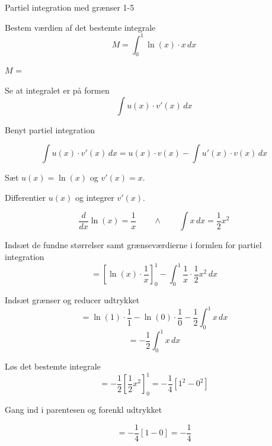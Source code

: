 \documentclass{article}
\begin{document}
\begin{exercise}{Partiel integration med grænser 1-5}


Bestem værdien af det bestemte integrale
\[
M = \int_0^1 \ln(x) \cdot x \, dx
\]

$M$ = 


\hint

Se at integralet er på formen
\[
\int u(x) \cdot v'(x) \, dx
\]

\hint

Benyt partiel integration

\hint
\[
\int u(x) \cdot v'(x)\, dx = u(x) \cdot v(x) - \int u'(x) \cdot v(x) \, dx
\]
\hint

Sæt $u(x) = \ln(x)$ og $v'(x) = x$.


\hint

Differentier $u(x)$ og integrer $v'(x)$.

\hint
\[
\frac{d}{dx} \ln(x) = \frac{1}{x} \qquad \wedge \qquad \int x \, dx = \frac{1}{2} x^2
\]

\hint

Indsæt de fundne størrelser samt grænseværdierne i formlen for partiel integration
\[
= \left[\ln(x) \cdot \frac{1}{x}\right]_{0}^{1} - \int_{0}^{1} \frac{1}{x} \cdot \frac{1}{2}x^2 \, dx
\]

\hint

Indsæt grænser og reducer udtrykket
\[
= \ln(1) \cdot \frac{1}{1} - \ln(0) \cdot \frac{1}{0} - \frac{1}{2} \int_{0}^{1} x \, dx
\]
\[
= - \frac{1}{2} \int_{0}^{1} x \, dx
\]

\hint
Løs det bestemte integrale
\[
= - \frac{1}{2} \left[ \frac{1}{2}x^2 \right]_{0}^{1} = - \frac{1}{4} \left[ 1^2 - 0^2 \right]
\]

\hint
Gang ind i parentesen og forenkl udtrykket

\hint
\[
= - \frac{1}{4} \left[ 1 - 0\right] = - \frac{1}{4}
\]



\end{exercise}

\newpage
\end{document}
